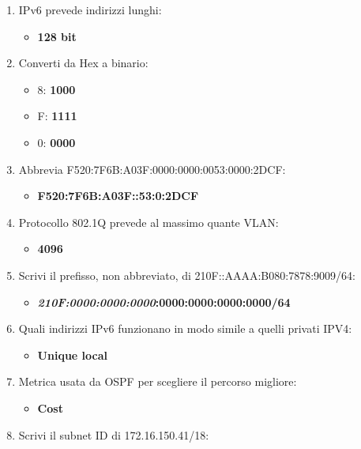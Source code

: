 \begin{enumerate}
\def\labelenumi{\arabic{enumi}.}
\setcounter{enumi}{5}
\item
  IPv6 prevede indirizzi lunghi:

  \begin{itemize}
  \item
    \textbf{128 bit}
  \end{itemize}
\item
  Converti da Hex a binario:

  \begin{itemize}
  \item
    8: \textbf{1000}
  \item
    F: \textbf{1111}
  \item
    0: \textbf{0000}
  \end{itemize}
\item
  Abbrevia F520:7F6B:A03F:0000:0000:0053:0000:2DCF:

  \begin{itemize}
  \item
    \textbf{F520:7F6B:A03F::53:0:2DCF}
  \end{itemize}
\item
  Protocollo 802.1Q prevede al massimo quante VLAN:

  \begin{itemize}
  \item
    \textbf{4096}
  \end{itemize}
\item
  Scrivi il prefisso, non abbreviato, di 210F::AAAA:B080:7878:9009/64:

  \begin{itemize}
  \item
    \textbf{\emph{210F:0000:0000:0000}:0000:0000:0000:0000/64}
  \end{itemize}
\item
  Quali indirizzi IPv6 funzionano in modo simile a quelli privati IPV4:

  \begin{itemize}
  \item
    \textbf{Unique local}
  \end{itemize}
\item
  Metrica usata da OSPF per scegliere il percorso migliore:

  \begin{itemize}
  \item
    \textbf{Cost}
  \end{itemize}
\item
  Scrivi il subnet ID di 172.16.150.41/18:


\end{enumerate}
